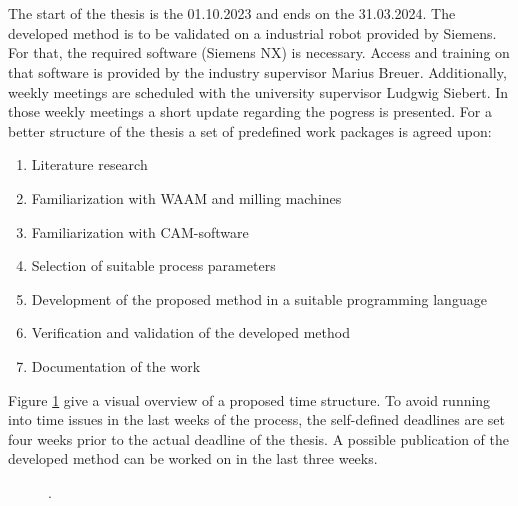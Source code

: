 \documentclass[ZLstudentexpose%
              ,optBiber%
              ,optEnglish%
              ,10pt
              ]{ZLlatex}%
\begin{document}
\section{}%
The start of the thesis is the 01.10.2023 and ends on the 31.03.2024. The developed method is to be validated on a industrial robot provided by Siemens. For that, the required software (Siemens NX) is necessary. Access and training on that software is provided by the industry supervisor Marius Breuer. 
Additionally, weekly meetings are scheduled with the university supervisor Ludgwig Siebert. In those weekly meetings a short update regarding the pogress is presented.  \newline
For a better structure of the thesis a set of predefined work packages is agreed upon:

\begin{enumerate}
\itemsep0em 
\item Literature research
\item Familiarization with WAAM and milling machines 
\item Familiarization with CAM-software 
\item Selection of suitable process parameters
\item Development of the proposed method in a suitable programming language
\item Verification and validation of the developed method
\item Documentation of the work
\end{enumerate}
Figure \ref{TIME} give a visual overview of a proposed time structure. 
To avoid running into time issues in the last weeks of the process, the self-defined deadlines are set four weeks prior to the actual deadline of the thesis. A possible publication of the developed method can be worked on in the last three weeks.
 
\begin{figure}[H]%
    \centering%
    \ZLlangGerEng{}{}%
    \caption{.}%
    \label{TIME}
\end{figure}%

\newpage
\section{}%

{%
    \printbibliography[heading=none]%
}%
\newpage
\end{document}
